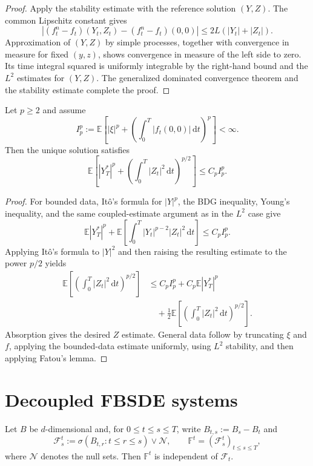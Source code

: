 \begin{proof}
Apply the stability estimate with the reference solution $(Y,Z)$.  The
common Lipschitz constant gives
\[
  |(f_t^n-f_t)(Y_t,Z_t)-(f_t^n-f_t)(0,0)|
  \le 2L(|Y_t|+|Z_t|).
\]
Approximation of $(Y,Z)$ by simple processes, together with convergence
in measure for fixed $(y,z)$, shows convergence in measure of the left
side to zero.  Its time integral squared is uniformly integrable by the
right-hand bound and the $L^2$ estimates for $(Y,Z)$.  The generalized
dominated convergence theorem and the stability estimate complete the
proof.
\end{proof}

\begin{thm}[$L^p$ estimate]
Let $p\ge2$ and assume
\[
  I_p^p:=\mathbb E\!\left[
    |\xi|^p+
    \left(\int_0^T|f_t(0,0)|\,\mathrm dt\right)^p
  \right]<\infty.
\]
Then the unique solution satisfies
\[
  \mathbb E\!\left[
    |Y_T^*|^p+
    \left(\int_0^T|Z_t|^2\,\mathrm dt\right)^{p/2}
  \right]
  \le C_p I_p^p.
\]
\end{thm}

\begin{proof}
For bounded data, It\^o's formula for $|Y|^p$, the BDG inequality,
Young's inequality, and the same coupled-estimate argument as in the
$L^2$ case give
\[
  \mathbb E|Y_T^*|^p
  +\mathbb E\!\left[
    \int_0^T|Y_t|^{p-2}|Z_t|^2\,\mathrm dt
  \right]
  \le C_pI_p^p.
\]
Applying It\^o's formula to $|Y|^2$ and then raising the resulting
estimate to the power $p/2$ yields
\[
\begin{aligned}
  \mathbb E\!\left[
    \left(\int_0^T|Z_t|^2\,\mathrm dt\right)^{p/2}
  \right]
  &\le C_p I_p^p+C_p\mathbb E|Y_T^*|^p\\
  &\quad+\frac12\mathbb E\!\left[
    \left(\int_0^T|Z_t|^2\,\mathrm dt\right)^{p/2}
  \right].
\end{aligned}
\]
Absorption gives the desired $Z$ estimate.  General data follow by
truncating $\xi$ and $f$, applying the bounded-data estimate uniformly,
using $L^2$ stability, and then applying Fatou's lemma.
\end{proof}

\section{Decoupled FBSDE systems}

Let $B$ be $d$-dimensional and, for $0\le t\le s\le T$, write
$B_{t,s}:=B_s-B_t$ and
\[
  \mathcal F_s^t:=\sigma(B_{t,r}:t\le r\le s)\vee\mathcal N,
  \qquad
  \mathbb F^t=(\mathcal F_s^t)_{t\le s\le T},
\]
where $\mathcal N$ denotes the null sets.  Then $\mathbb F^t$ is
independent of $\mathcal F_t$.

